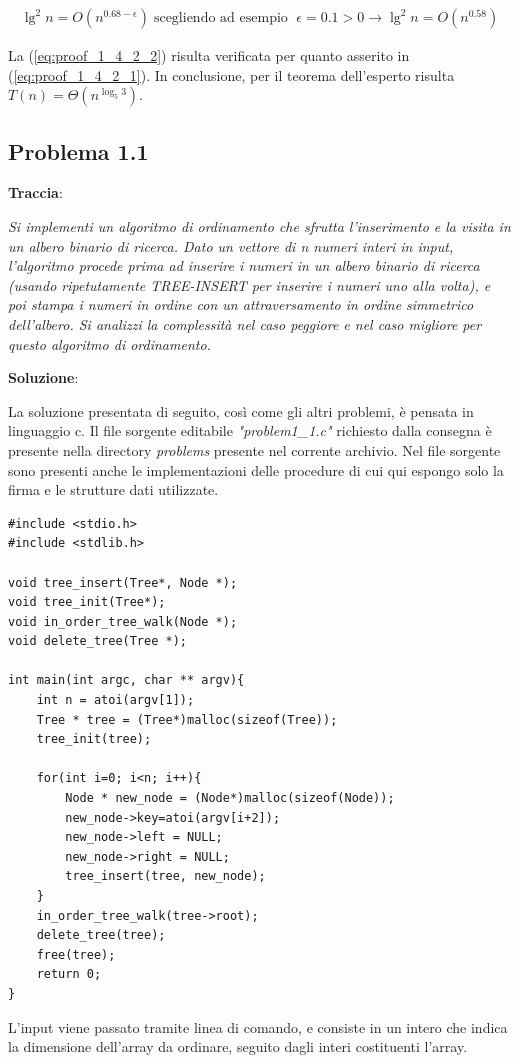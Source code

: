 \documentclass{article}
\begin{document}
\begin{equation} \label{eq:proof_1_4_2_2}
\begin{aligned}
\lg^2 n = O(n^{0.68 - \epsilon}) \; \text{scegliendo ad esempio } \; \epsilon = 0.1 > 0 \rightarrow \lg^2 n = O(n^{0.58})
\end{aligned}
\end{equation}

\noindent La (\ref{eq:proof_1_4_2_2}) risulta verificata per quanto asserito in (\ref{eq:proof_1_4_2_1}). In conclusione, per il teorema dell'esperto risulta $T(n) = \Theta(n^{\log_{5}{3}})$.


\subsection{Problema 1.1} \label{subsec:problema_1_1}
\textbf{Traccia}:

\noindent
\textit{Si implementi un algoritmo di ordinamento che sfrutta l'inserimento e la visita in un albero  binario di ricerca. Dato un vettore di n numeri interi in input, l'algoritmo procede prima ad 
inserire i numeri in un albero binario di ricerca (usando ripetutamente TREE-INSERT per inserire i numeri uno alla volta), e poi stampa i numeri in ordine con un attraversamento in ordine simmetrico dell'albero. Si analizzi la complessità nel caso peggiore e nel caso migliore per questo algoritmo di ordinamento.}

\vspace{2\baselineskip}
\noindent
\textbf{Soluzione}: 

\noindent
La soluzione presentata di seguito, così come gli altri problemi, è pensata in linguaggio c. Il file sorgente editabile \textit{"problem1\_1.c"} richiesto dalla consegna è presente nella directory \textit{problems} presente nel corrente archivio. Nel file sorgente sono presenti anche le implementazioni delle procedure di cui qui espongo solo la firma e le strutture dati utilizzate.

\begin{lstlisting}
#include <stdio.h>
#include <stdlib.h>

void tree_insert(Tree*, Node *);
void tree_init(Tree*);
void in_order_tree_walk(Node *);
void delete_tree(Tree *);

int main(int argc, char ** argv){
    int n = atoi(argv[1]);
    Tree * tree = (Tree*)malloc(sizeof(Tree));
    tree_init(tree);

    for(int i=0; i<n; i++){
        Node * new_node = (Node*)malloc(sizeof(Node));
        new_node->key=atoi(argv[i+2]);
        new_node->left = NULL;
        new_node->right = NULL;
        tree_insert(tree, new_node);
    }
    in_order_tree_walk(tree->root);
    delete_tree(tree);
    free(tree);
    return 0;
}

\end{lstlisting}
\noindent
L'input viene passato tramite linea di comando, e consiste in un intero che indica la dimensione dell'array da ordinare, seguito dagli interi costituenti l'array.
\end{document}
